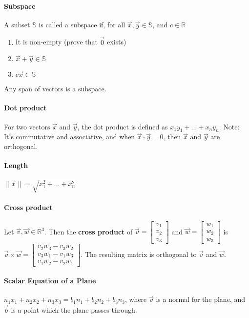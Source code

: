 \documentclass[10pt,letter]{article}
\begin{document}
\paragraph{Subspace} A subset $\mathbb{S}$ is called a subspace if, for all $\vec{x},\vec{y}\in\mathbb{S}$, and $c\in\mathbb{R}$ \begin{enumerate}
    \item It is non-empty (prove that $\vec{0}$ exists)
    \item $\vec{x}+\vec{y}\in\mathbb{S}$ 
    \item $c\vec{x}\in\mathbb{S}$
\end{enumerate} Any span of vectors is a subspace. 

\paragraph{Dot product} For two vectors $\vec{x}$ and $\vec{y}$, the dot product is defined as $x_1y_1+\ldots+x_ny_n$. Note: It's commutative and associative, and when $\vec{x}\cdot\vec{y}=0$, then $\vec{x}$ and $\vec{y}$ are orthogonal. 

\paragraph{Length} $\|\vec{x}\|=\sqrt{x_1^2+\ldots+x_n^2}$

\paragraph{Cross product} Let $\vec{v},\vec{w}\in\mathbb{R}^3$. Then the \textbf{cross product} of $\vec{v}=\begin{bmatrix}v_1\\v_2\\v_3\end{bmatrix}$ and $\vec{w}=\begin{bmatrix}w_1\\w_2\\w_3\end{bmatrix}$ is $\vec{v}\times\vec{w}=\begin{bmatrix}v_2w_3-v_3w_2\\v_3w_1-v_1w_3\\v_1w_2-v_2w_1\end{bmatrix}$. The resulting matrix is orthogonal to $\vec{v}$ and $\vec{w}$. 

\paragraph{Scalar Equation of a Plane} $n_1x_1+n_2x_2+n_3x_3=b_1n_1+b_2n_2+b_3n_3$, where $\vec{v}$ is a normal for the plane, and $\vec{b}$ is a point which the plane passes through. 
\end{document}

